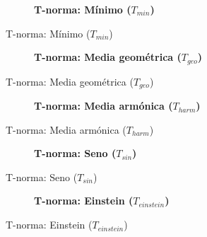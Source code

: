 \begin{figure}[h!]
\centering
\begin{subfigure}[b]{\textwidth}
	\textbf{T-norma: Mínimo ($T_{min}$)} \\
	\setlength\figureheight{2cm}
	\setlength\figurewidth{7cm}
	
\end{subfigure}
\label{fig:fire-detection-interpolation-comparison-tnorm-min}
\caption{T-norma: Mínimo ($T_{min}$)}
\end{figure}
\begin{figure}[h!]
\centering
\begin{subfigure}[b]{\textwidth}
	\textbf{T-norma: Media geométrica ($T_{geo}$)} \\
	\setlength\figureheight{2cm}
	\setlength\figurewidth{7cm}
	
\end{subfigure}
\caption{T-norma: Media geométrica ($T_{geo}$)}
\label{fig:fire-detection-interpolation-comparison-tnorm-geomean}
\end{figure}
\begin{figure}[h!]
\centering
\begin{subfigure}[b]{\textwidth}
	\textbf{T-norma: Media armónica ($T_{harm}$)} \\
	\setlength\figureheight{2cm}
	\setlength\figurewidth{7cm}
	
\end{subfigure}
\caption{T-norma: Media armónica ($T_{harm}$)}
\label{fig:fire-detection-interpolation-comparison-tnorm-harmmean}
\end{figure}
\begin{figure}[h!]
\centering
\begin{subfigure}[b]{\textwidth}
	\textbf{T-norma: Seno ($T_{sin}$)} \\
	\setlength\figureheight{2cm}
	\setlength\figurewidth{7cm}
	
\end{subfigure}
\caption{T-norma: Seno ($T_{sin}$)}
\label{fig:fire-detection-interpolation-comparison-tnorm-sinmean}
\end{figure}
\begin{figure}[h!]
\centering
\begin{subfigure}[b]{\textwidth}
	\textbf{T-norma: Einstein ($T_{einstein}$)} \\
	\setlength\figureheight{2cm}
	\setlength\figurewidth{7cm}
	
\end{subfigure}
\caption{T-norma: Einstein ($T_{einstein}$)}
\label{fig:fire-detection-interpolation-comparison-tnorm-einstein}
\end{figure}

